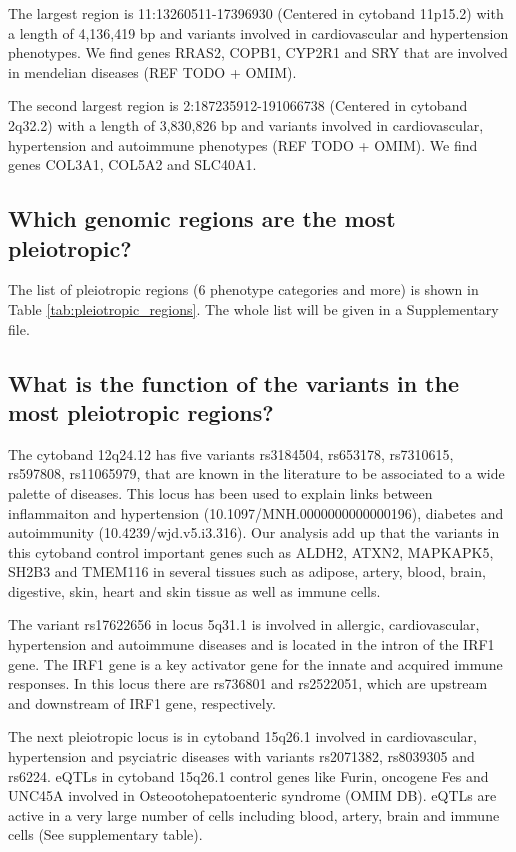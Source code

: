 The largest region is 11:13260511-17396930 (Centered in cytoband 11p15.2) with a length of 4,136,419 bp and variants involved in cardiovascular and hypertension phenotypes.
We find genes RRAS2, COPB1, CYP2R1 and SRY that are involved in mendelian diseases (REF TODO + OMIM).

The second largest region is 2:187235912-191066738 (Centered in cytoband 2q32.2) with a length of 3,830,826 bp and variants involved in cardiovascular, hypertension and autoimmune phenotypes (REF TODO + OMIM).
We find genes COL3A1, COL5A2 and SLC40A1.

\subsection*{Which genomic regions are the most pleiotropic?}

The list of pleiotropic regions (6 phenotype categories and more) is shown in Table \ref{tab:pleiotropic_regions}. The whole list will be given in a Supplementary file.

\subsection*{What is the function of the variants in the most pleiotropic regions?}

The cytoband 12q24.12 has five variants rs3184504, rs653178, rs7310615, rs597808, rs11065979, that are known in the literature to be associated to a wide palette of diseases.
This locus has been used to explain links between inflammaiton and hypertension (10.1097/MNH.0000000000000196), diabetes and autoimmunity (10.4239/wjd.v5.i3.316).
%
Our analysis add up that the variants in this cytoband control important genes such as ALDH2, ATXN2, MAPKAPK5, SH2B3 and TMEM116 in several tissues such as adipose, artery, blood, brain, digestive, skin, heart and skin tissue as well as immune cells.

The variant rs17622656 in locus 5q31.1 is involved in allergic, cardiovascular, hypertension and autoimmune diseases and is located in the intron of the IRF1 gene.
The IRF1 gene is a key activator gene for the innate and acquired immune responses.
In this locus there are rs736801 and rs2522051, which are upstream and downstream of IRF1 gene, respectively.


The next pleiotropic locus is in cytoband 15q26.1 involved in cardiovascular, hypertension and psyciatric diseases with variants rs2071382, rs8039305 and rs6224.
%
eQTLs in cytoband 15q26.1 control genes like Furin, oncogene Fes and UNC45A involved in Osteootohepatoenteric syndrome (OMIM DB).
%
eQTLs are active in a very large number of cells including blood, artery, brain and immune cells (See supplementary table).


